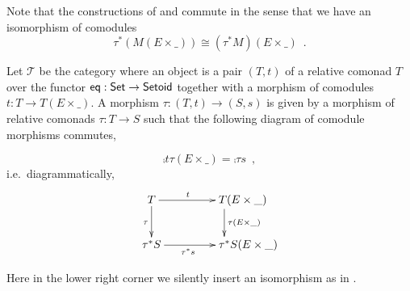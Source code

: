 \documentclass{amsart}
\begin{document}
\begin{remark}\label{rem:prod_pullback_commute}
 Note that the constructions of  and  commute in the sense that
 we have an isomorphism of comodules \[\tau^*(M(E\times \_)) \cong (\tau^*M)(E \times \_) \enspace . \]
\end{remark}



\begin{example}\label{ex:final_sem_tri}
   Let $\mathcal{T}$ be the category where an object is a pair $(T,t)$ of a relative comonad $T$ over the functor
   $\mathsf{eq}: \mathsf{Set} \to \mathsf{Setoid}$ together with a morphism of comodules $t : T \to T(E \times \_)$.
   A morphism $\tau : (T,t) \to (S,s)$ is given by a morphism of relative comonads $\tau : T \to S$ such that
   the following diagram of comodule morphisms commutes,
   
   \[     \comp{t}{\tau(E\times \_)} = \comp{\tau}{s} \enspace , \]
   i.e.\, diagrammatically,   
   \[ \begin{xy}
       \xymatrix{   T  \ar[r]^t \ar[d]_{\tau}  &  **[r]T (E\times \_ )\ar[d]^{\tau(E\times \_)} \\
                    \tau^*S  \ar[r]_{\tau^*s}  &  **[r] \tau^*S (E\times \_ )
        }
      \end{xy}
   \]

   \noindent
   Here in the lower right corner we silently insert an isomorphism as in .
   
\end{example}


\end{document}
